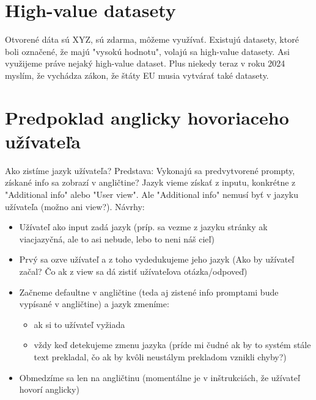 \section{High-value datasety}

Otvorené dáta sú XYZ, sú zdarma, môžeme využívať. Existujú datasety, ktoré boli označené, že majú "vysokú hodnotu", volajú sa high-value datasety. Asi využijeme práve nejaký high-value dataset. Plus niekedy teraz v roku 2024 myslím, že vychádza zákon, že štáty EU musia vytvárať také datasety.

\section{Predpoklad anglicky hovoriaceho užívateľa}

Ako zistíme jazyk užívateľa? Predstava: Vykonajú sa predvytvorené prompty, získané info sa zobrazí v angličtine? Jazyk vieme získať z inputu, konkrétne z "Additional info" alebo "User view". Ale "Additional info" nemusí byť v jazyku užívateľa (možno ani view?). Návrhy:
\begin{itemize}
\item Užívateľ ako input zadá jazyk (príp. sa vezme z jazyku stránky ak viacjazyčná, ale to asi nebude, lebo to neni náš cieľ)
\item Prvý sa ozve užívateľ a z toho vydedukujeme jeho jazyk (Ako by užívateľ začal? Čo ak z view sa dá zistiť užívateľova otázka/odpoveď)
\item Začneme defaultne v angličtine (teda aj zistené info promptami bude vypísané v angličtine) a jazyk zmeníme:
\begin{itemize}
\item ak si to užívateľ vyžiada
\item vždy keď detekujeme zmenu jazyka (príde mi čudné ak by to systém stále text prekladal, čo ak by kvôli neustálym prekladom vznikli chyby?)
\end{itemize}
\item Obmedzíme sa len na angličtinu (momentálne je v inštrukciách, že užívateľ hovorí anglicky)
\end{itemize}

    